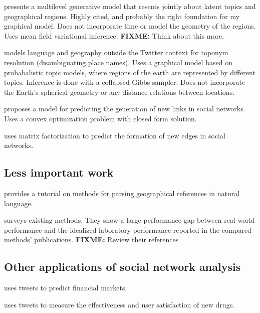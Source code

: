 \documentclass{article}
\newcommand{\fixme}[1]{\textbf{FIXME:} {#1}}
\begin{document}
\citet{eisenstein2010latent} presents a multilevel generative model that resents jointly about latent topics and geographical regions.
Highly cited, and probably the right foundation for my graphical model.
Does not incorporate time or model the geometry of the regions.
Uses mean field variational inference.
\fixme{Think about this more.}

\citet{speriosu2010connecting} models language and geography outside the Twitter context for toponym resolution (disambiguating place names).
Uses a graphical model based on probabalistic topic models,
where regions of the earth are represented by different topics.
Inference is done with a collapsed Gibbs sampler.
Does not incorporate the Earth's spherical geometry or any distance relations between locations.

\citet{wu2017link} proposes a model for predicting the generation of new links in social networks. 
Uses a convex optimization problem with closed form solution.

\citet{yu2017temporally} uses matrix factorization to predict the formation of new edges in social networks.


\subsection{Less important work}

\citet{leidner2011detecting} provides a tutorial on methods for parsing geographical references in natural language.

\citet{jurgens2015geolocation} surveys existing methods.
They show a large performance gap between real world performance and the idealized laboratory-performance reported in the compared methods' publications.
\fixme{Review their references}


\subsection{Other applications of social network analysis}

\citet{ruiz2012correlating} uses tweets to predict financial markets.

\citet{wiley2014pharmaceutical} uses tweets to measure the effectiveness and user satisfaction of new drugs.


\clearpage


\end{document}
